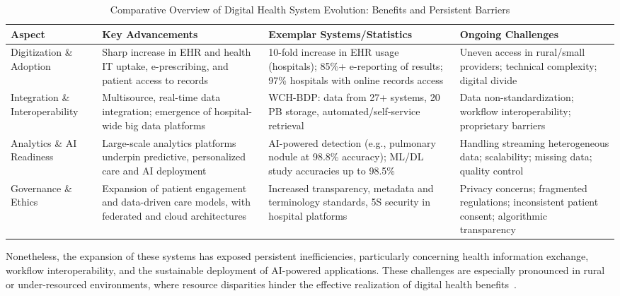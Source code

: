 \documentclass[sigconf]{acmart}
\begin{document}
\begin{table*}[htbp]
\centering
\caption{Comparative Overview of Digital Health System Evolution: Benefits and Persistent Barriers}
\label{tab:system_comparison}
\begin{adjustbox}{max width=\textwidth}
\begin{tabular}{@{}llll@{}}
\toprule
\textbf{Aspect} & \textbf{Key Advancements} & \textbf{Exemplar Systems/Statistics} & \textbf{Ongoing Challenges} \\
\midrule
Digitization \& Adoption & Sharp increase in EHR and health IT uptake, e-prescribing, and patient access to records~\cite{ref82} & 10-fold increase in EHR usage (hospitals); 85\%+ e-reporting of results; 97\% hospitals with online records access~\cite{ref82} & Uneven access in rural/small providers; technical complexity; digital divide \\
Integration \& Interoperability & Multisource, real-time data integration; emergence of hospital-wide big data platforms~\cite{ref84} & WCH-BDP: data from 27+ systems, 20 PB storage, automated/self-service retrieval~\cite{ref84} & Data non-standardization; workflow interoperability; proprietary barriers \\
Analytics \& AI Readiness & Large-scale analytics platforms underpin predictive, personalized care and AI deployment~\cite{ref90,ref106} & AI-powered detection (e.g., pulmonary nodule at 98.8\% accuracy); ML/DL study accuracies up to 98.5\%~\cite{ref84,ref90} & Handling streaming heterogeneous data; scalability; missing data; quality control~\cite{ref90,ref106} \\
Governance \& Ethics & Expansion of patient engagement and data-driven care models, with federated and cloud architectures~\cite{ref82,ref84} & Increased transparency, metadata and terminology standards, 5S security in hospital platforms~\cite{ref84} & Privacy concerns; fragmented regulations; inconsistent patient consent; algorithmic transparency~\cite{ref82,ref84} \\
\bottomrule
\end{tabular}
\end{adjustbox}
\end{table*}

Nonetheless, the expansion of these systems has exposed persistent inefficiencies, particularly concerning health information exchange, workflow interoperability, and the sustainable deployment of AI-powered applications. These challenges are especially pronounced in rural or under-resourced environments, where resource disparities hinder the effective realization of digital health benefits~\cite{ref82,ref84}.
\end{document}
